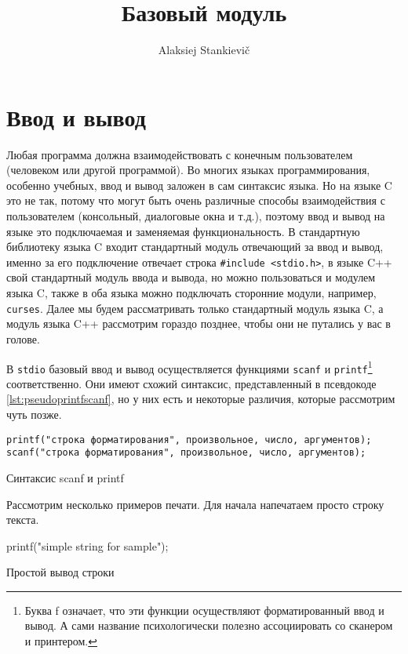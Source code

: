 \documentclass[12pt]{article}
\author{Alaksiej Stankievič}
\title{Базовый модуль}
\begin{document}

\section{Ввод и вывод}
Любая программа должна взаимодействовать с конечным пользователем (человеком или другой программой). Во многих языках программирования, особенно учебных, ввод и вывод заложен в сам синтаксис языка. Но на языке C это не так, потому что могут быть очень различные способы взаимодействия с пользователем (консольный, диалоговые окна и т.д.), поэтому ввод и вывод на языке это подключаемая и заменяемая функциональность. В стандартную библиотеку языка C входит стандартный модуль отвечающий за ввод и вывод, именно за его подключение отвечает строка \verb|#include <stdio.h>|, в языке C++ свой стандартный модуль ввода и вывода, но можно пользоваться и модулем языка C, также в оба языка можно подключать сторонние модули, например, \verb|curses|. Далее мы будем рассматривать только стандартный модуль языка C, а модуль языка C++ рассмотрим гораздо позднее, чтобы они не путались у вас в голове.

В \verb|stdio| базовый ввод и вывод осуществляется функциями \verb|scanf| и \verb|printf|\footnote{Буква f означает, что эти функции осуществляют форматированный ввод и вывод. А сами название психологически полезно ассоциировать со сканером и принтером.} соответственно. Они имеют схожий синтаксис, представленный в псевдокоде \ref{lst:pseudoprintfscanf}, но у них есть и некоторые различия, которые рассмотрим чуть позже.

\begin{listing}[H]
\begin{center}
\begin{verbatim}
printf("строка форматирования", произвольное, число, аргументов);
scanf("строка форматирования", произвольное, число, аргументов);
\end{verbatim}
\end{center}
\caption{Синтаксис scanf и printf}
\label{lst:pseudoprintfscanf}
\end{listing}


Рассмотрим несколько примеров печати. Для начала напечатаем просто строку текста.

\begin{listing}[H]
\begin{ccode}
printf("simple string for sample");
\end{ccode}
\caption{Простой вывод строки}
\label{lst:simplestring}
\end{listing}
\end{document}
